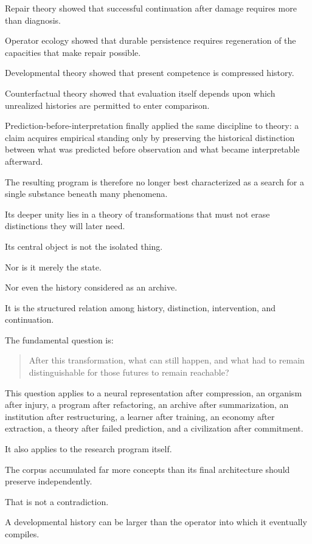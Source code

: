 \documentclass[11pt]{article}
\theoremstyle{remark}
\begin{document}
Repair theory showed that successful continuation after damage requires more than diagnosis.

Operator ecology showed that durable persistence requires regeneration of the capacities that make repair possible.

Developmental theory showed that present competence is compressed history.

Counterfactual theory showed that evaluation itself depends upon which unrealized histories are permitted to enter comparison.

Prediction-before-interpretation finally applied the same discipline to theory: a claim acquires empirical standing only by preserving the historical distinction between what was predicted before observation and what became interpretable afterward.

The resulting program is therefore no longer best characterized as a search for a single substance beneath many phenomena.

Its deeper unity lies in a theory of transformations that must not erase distinctions they will later need.

Its central object is not the isolated thing.

Nor is it merely the state.

Nor even the history considered as an archive.

It is the structured relation among history, distinction, intervention, and continuation.

The fundamental question is:

\begin{quote}
After this transformation, what can still happen, and what had to remain distinguishable for those futures to remain reachable?
\end{quote}

This question applies to a neural representation after compression, an organism after injury, a program after refactoring, an archive after summarization, an institution after restructuring, a learner after training, an economy after extraction, a theory after failed prediction, and a civilization after commitment.

It also applies to the research program itself.

The corpus accumulated far more concepts than its final architecture should preserve independently.

That is not a contradiction.

A developmental history can be larger than the operator into which it eventually compiles.
\end{document}
